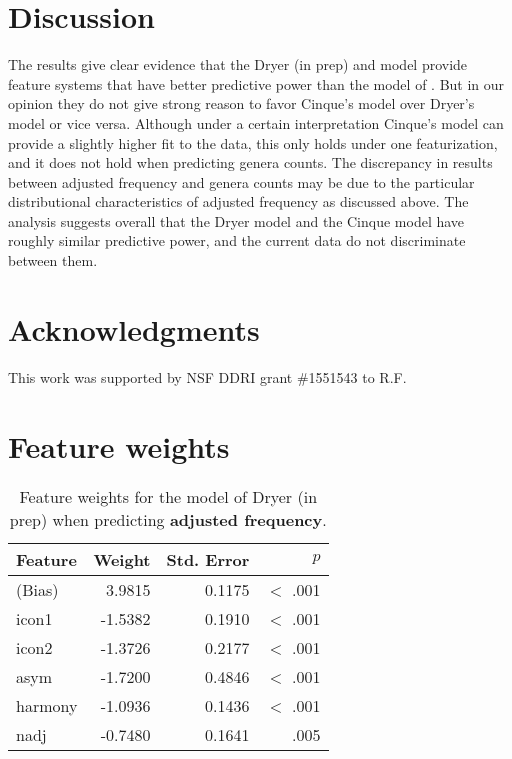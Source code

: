 \documentclass[11pt]{article}
\newcommand{\lt}{<}
\begin{document}
\section{Discussion}

The results give clear evidence that the Dryer (in prep) and \citet{cinque2005deriving} model provide feature systems that have better predictive power than the model of \citet{cysouw2010dealing}. But in our opinion they do not give strong reason to favor Cinque's model over Dryer's model or vice versa. Although under a certain interpretation Cinque's model can provide a slightly higher fit to the data, this only holds under one featurization, and it does not hold when predicting genera counts. The discrepancy in results between adjusted frequency and genera counts may be due to the particular distributional characteristics of adjusted frequency as discussed above. The analysis suggests overall that the Dryer model and the Cinque model have roughly similar predictive power, and the current data do not discriminate between them.


\section*{Acknowledgments} 

This work was supported by NSF DDRI grant \#1551543 to R.F.

\nocite{dryer2017order}




\appendix
\section{Feature weights}
\begin{table}[ht!]
  \centering
  \begin{tabular}{|l|r|r|r|}
    \hline
    Feature & Weight & Std. Error & $p$ \\
    \hline
    (Bias) &  3.9815  &   0.1175 &  $\lt$ .001 \\
    icon1  & -1.5382  &   0.1910 &  $\lt$ .001 \\
    icon2  & -1.3726 &      0.2177 &  $\lt$ .001 \\
    asym  &  -1.7200 &      0.4846 &  $\lt$ .001 \\
    harmony &     -1.0936   &  0.1436 & $\lt$ .001 \\
    nadj    &     -0.7480  &   0.1641 & .005    \\
    \hline
  \end{tabular}
  \caption{Feature weights for the model of Dryer (in prep) when predicting \textbf{adjusted frequency}.}
\end{table}
\end{document}
